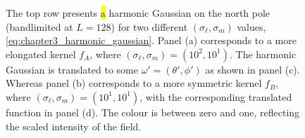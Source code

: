 \begin{figure}[htpb]
	\caption[
	Two harmonic Gaussians on the north pole and then translated
	]{
	The top row presents \hl{a} harmonic Gaussian on the north pole (bandlimited at \(L=128\)) for two different \((\sigma_{\ell},\sigma_{m})\) values, \cf{} \cref{eq:chapter3_harmonic_gaussian}.
	Panel (a) corresponds to a more elongated kernel \(f_{A}\), where \((\sigma_{\ell},\sigma_{m}) = (10^{2},10^{1})\).
	The harmonic Gaussian is translated to some \(\omega'=(\theta',\phi')\) as shown in panel (c).
	Whereas panel (b) corresponds to a more symmetric kernel \(f_{B}\), where \((\sigma_{\ell},\sigma_{m}) = (10^{1},10^{1})\), with the corresponding translated function in panel (d).
	The colour is between zero and one, reflecting the scaled intensity of the field.
	}\label{fig:chapter3_harmonic_gaussian}
\end{figure}
